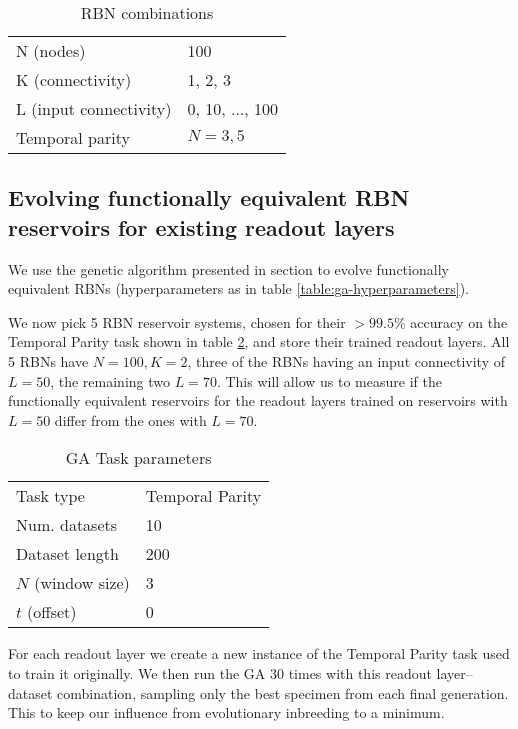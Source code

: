 \begin{table}
  \centering
  \caption{RBN combinations}
  \label{table:rbn-combinations}
  \begin{tabular}{ll}
    N (nodes)              & 100             \\
    K (connectivity)       & 1, 2, 3         \\
    L (input connectivity) & 0, 10, ..., 100 \\
    Temporal parity        & $N=3,5$ \\
  \end{tabular}
\end{table}

\subsection{Evolving functionally equivalent RBN reservoirs for existing readout layers}
\label{section:experiments:evolving}

We use the genetic algorithm presented in section \label{section:method:evolving-rbns} to evolve functionally equivalent RBNs (hyperparameters as in table \ref{table:ga-hyperparameters}).

We now pick 5 RBN reservoir systems,
chosen for their $> 99.5\%$ accuracy on the Temporal Parity task shown in table
\ref{table:ga-task-parameters},
and store their trained readout layers.
All 5 RBNs have $N=100, K=2$, three of the RBNs having an input connectivity of $L=50$,
the remaining two $L=70$.
This will allow us to measure if the functionally equivalent reservoirs for the readout layers trained on reservoirs with $L=50$ differ from the ones with $L=70$.

\begin{table}
  \centering
  \caption{GA Task parameters}
  \label{table:ga-task-parameters}
  \begin{tabular}{ll}
    Task type         & Temporal Parity \\
    Num. datasets     & 10               \\
    Dataset length    & 200             \\
    $N$ (window size) & 3               \\
    $t$ (offset)      & 0               \\
  \end{tabular}
\end{table}

For each readout layer we create a new instance of the Temporal Parity task used to train it originally.
We then run the GA 30 times with this readout layer–dataset combination,
sampling only the best specimen from each final generation.
This to keep our influence from evolutionary inbreeding to a minimum.
